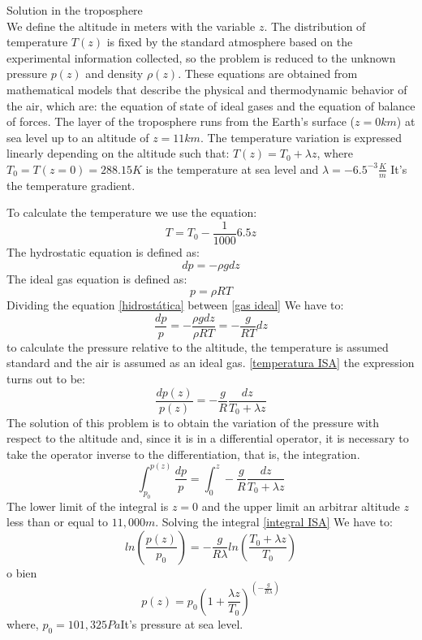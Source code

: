Solution in the troposphere \cite{franchini2013}\\
We define the altitude in meters with the variable $z$. The distribution of temperature $T(z)$ is fixed by the standard atmosphere based on the experimental information collected, so the problem is reduced to the unknown pressure $p(z)$ and density $\rho(z)$. These equations are obtained from mathematical models that describe the physical and thermodynamic behavior of the air, which are: the equation of state of ideal gases and the equation of balance of forces.
%
The layer of the troposphere runs from the Earth's surface ($z=0km$) at sea level up to an altitude of $z=11km$. The temperature variation is expressed linearly depending on the altitude such that: $T(z)=T_0 + \lambda z$, where $T_0 = T(z=0)=288.15 K$ is the temperature at sea level and $\lambda = -6.5^{-3} \frac{K}{m}$ It's the temperature gradient. 

To calculate the temperature we use the equation:
\begin{equation}
\label{temperatura ISA}
    T = T_0 - \frac{1}{1000} 6.5 z
\end{equation}
The hydrostatic equation is defined as:
\begin{equation}
\label{hidrostática}
    dp = -\rho g dz
\end{equation}
The ideal gas equation is defined as:
\begin{equation}
\label{gas ideal}
    p = \rho R T 
\end{equation}
Dividing the equation \ref{hidrostática} between \ref{gas ideal} We have to:
\begin{equation}
    \frac{dp}{p}=-\frac{\rho g dz}{\rho R T} = - \frac{g}{RT}dz
\end{equation}
to calculate the pressure relative to the altitude, the temperature is assumed standard and the air is assumed as an ideal gas. \ref{temperatura ISA} the expression turns out to be:
\begin{equation}
    \frac{dp(z)}{p(z)}= - \frac{g}{R} \frac{dz}{T_0 + \lambda z}
\end{equation}
The solution of this problem is to obtain the variation of the pressure with respect to the altitude and, since it is in a differential operator, it is necessary to take the operator inverse to the differentiation, that is, the integration.
\begin{equation}
\label{integral ISA}
    \int_{p_0}^{p(z)} \frac{dp}{p} = \int_{0}^{z} - \frac{g}{R} \frac{dz}{T_0 + \lambda z}
\end{equation}
The lower limit of the integral is $z=0$ and the upper limit an arbitrar altitude $z$ less than or equal to $11,000 m$. Solving the integral \ref{integral ISA} We have to:
\begin{equation}
    ln (\frac{p(z)}{p_0})= - \frac{g}{R \lambda} ln (\frac{T_0 + \lambda z}{T_0})
\end{equation}
o bien
\begin{equation}
\label{presion ISA}
    p(z) = p_0 (1 + \frac{\lambda z}{T_0})^{(- \frac{g}{R \lambda})}
\end{equation}
where, $p_0 = 101,325 Pa$It's pressure at sea level. 

